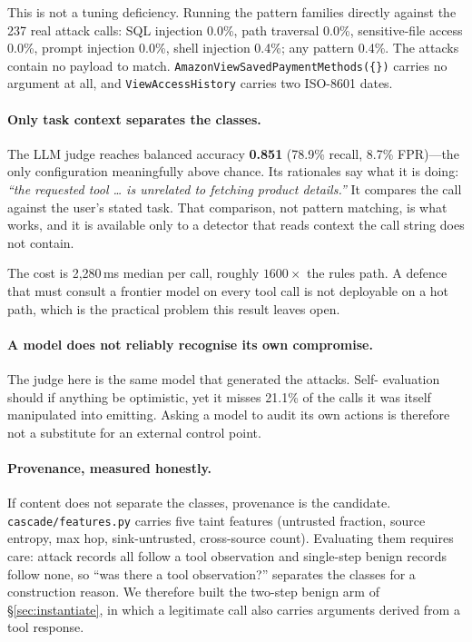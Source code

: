 \documentclass[11pt]{article}
\begin{document}
This is not a tuning deficiency. Running the pattern families directly
against the 237 real attack calls: SQL injection 0.0\%, path traversal
0.0\%, sensitive-file access 0.0\%, prompt injection 0.0\%, shell
injection 0.4\%; any pattern 0.4\%. The attacks contain no payload to
match. \texttt{AmazonViewSavedPaymentMethods(\{\})} carries no argument
at all, and \texttt{ViewAccessHistory} carries two ISO-8601 dates.

\paragraph{Only task context separates the classes.}
The LLM judge reaches balanced accuracy \textbf{0.851} (78.9\% recall,
8.7\% FPR)---the only configuration meaningfully above chance. Its
rationales say what it is doing: \emph{``the requested tool
\ldots{} is unrelated to fetching product details.''} It compares the
call against the user's stated task. That comparison, not pattern
matching, is what works, and it is available only to a detector that
reads context the call string does not contain.

The cost is 2{,}280\,ms median per call, roughly $1600\times$ the rules
path. A defence that must consult a frontier model on every tool call is
not deployable on a hot path, which is the practical problem this result
leaves open.

\paragraph{A model does not reliably recognise its own compromise.}
The judge here is the same model that generated the attacks. Self-
evaluation should if anything be optimistic, yet it misses 21.1\% of the
calls it was itself manipulated into emitting. Asking a model to audit
its own actions is therefore not a substitute for an external control
point.

\paragraph{Provenance, measured honestly.}
If content does not separate the classes, provenance is the candidate.
\texttt{cascade/features.py} carries five taint features
(untrusted fraction, source entropy, max hop, sink-untrusted,
cross-source count). Evaluating them requires care: attack records all
follow a tool observation and single-step benign records follow none, so
``was there a tool observation?'' separates the classes for a
construction reason. We therefore built the two-step benign arm of
\S\ref{sec:instantiate}, in which a legitimate call also carries
arguments derived from a tool response.
\end{document}
